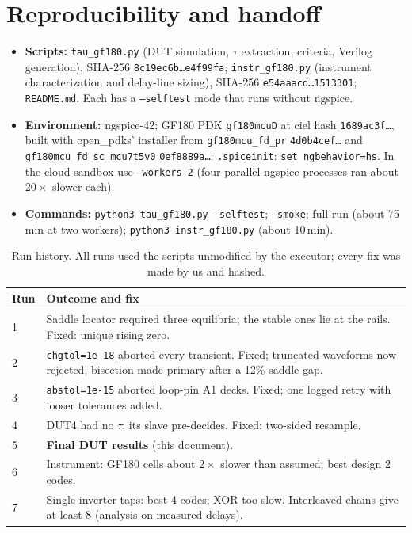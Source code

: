 \documentclass[11pt]{article}
\begin{document}
\section{Reproducibility and handoff}
\begin{itemize}
\item \textbf{Scripts:} \texttt{tau\_gf180.py} (DUT simulation, $\tau$ extraction, criteria, Verilog generation),
  SHA-256 \texttt{8c19ec6b\ldots e4f99fa}; \texttt{instr\_gf180.py} (instrument characterization and delay-line
  sizing), SHA-256 \texttt{e54aaacd\ldots 1513301}; \texttt{README.md}. Each has a \texttt{--selftest} mode that runs without ngspice.
\item \textbf{Environment:} ngspice-42; GF180 PDK \texttt{gf180mcuD} at ciel hash \texttt{1689ac3f\ldots}, built with
  open\_pdks' installer from \texttt{gf180mcu\_fd\_pr} \texttt{4d0b4cef\ldots} and \texttt{gf180mcu\_fd\_sc\_mcu7t5v0}
  \texttt{0ef8889a\ldots}; \texttt{.spiceinit}: \texttt{set ngbehavior=hs}. In the cloud sandbox use
  \texttt{--workers 2} (four parallel ngspice processes ran about $20\times$ slower each).
\item \textbf{Commands:} \texttt{python3 tau\_gf180.py --selftest}; \texttt{--smoke}; full run
  (about 75\,min at two workers); \texttt{python3 instr\_gf180.py} (about 10\,min).
\end{itemize}
\begin{table}[H]
\centering\small
\begin{tabularx}{\linewidth}{@{}lX@{}}
\toprule
Run & Outcome and fix \\
\midrule
1 & Saddle locator required three equilibria; the stable ones lie at the rails. Fixed: unique rising zero. \\
2 & \texttt{chgtol=1e-18} aborted every transient. Fixed; truncated waveforms now rejected; bisection made primary after a 12\% saddle gap. \\
3 & \texttt{abstol=1e-15} aborted loop-pin A1 decks. Fixed; one logged retry with looser tolerances added. \\
4 & DUT4 had no $\tau$: its slave pre-decides. Fixed: two-sided resample. \\
5 & \textbf{Final DUT results} (this document). \\
6 & Instrument: GF180 cells about $2\times$ slower than assumed; best design 2 codes. \\
7 & Single-inverter taps: best 4 codes; XOR too slow. Interleaved chains give at least 8 (analysis on measured delays). \\
\bottomrule
\end{tabularx}
\caption{Run history. All runs used the scripts unmodified by the executor; every fix was made by us and hashed.}
\end{table}
\end{document}
